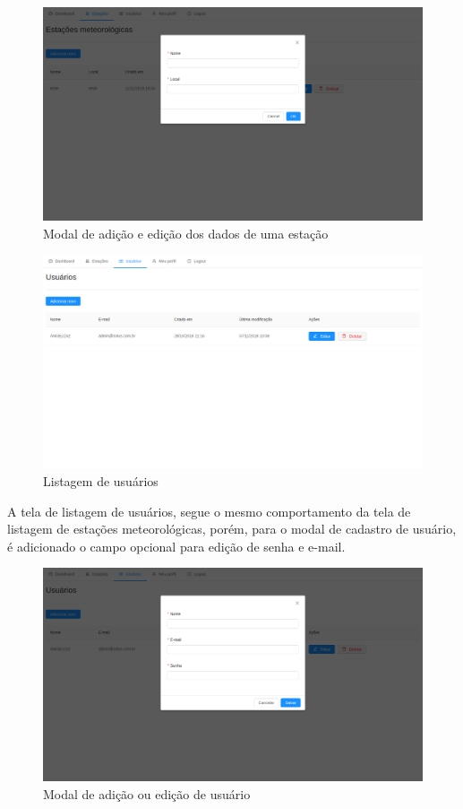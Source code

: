 \begin{figure}[H]
    \centering
    \caption{Modal de adição e edição dos dados de uma estação \label{fig:estacoes_add}}
    \includegraphics[scale=0.3]{telas/estacoes_add.png}
    \hfill
{}
\end{figure}

\begin{figure}[H]
    \centering
    \caption{Listagem de usuários}
    \includegraphics[scale=0.3]{telas/usuarios.png}
    \hfill
{}
\end{figure}

A tela de listagem de usuários, segue o mesmo comportamento da tela de listagem de estações meteorológicas, porém, para o modal de cadastro de usuário, é adicionado o campo opcional para edição de senha e e-mail.

\begin{figure}[H]
    \centering
    \caption{Modal de adição ou edição de usuário}
    \includegraphics[scale=0.3]{telas/usuarios_add.png}
    \hfill
{}
\end{figure}

